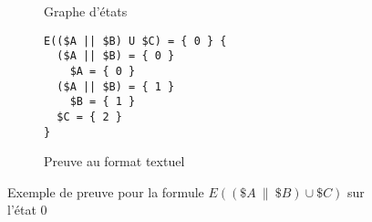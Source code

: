 \begin{figure}[H]
\centering
\begin{subfigure}[b]{.4\textwidth}
\centering
\caption{Graphe d'états}
\end{subfigure}
\begin{subfigure}[b]{.4\textwidth}
\centering
\begin{minipage}{0.74\linewidth}
\begin{verbatim}
E(($A || $B) U $C) = { 0 } {
  ($A || $B) = { 0 }
    $A = { 0 }
  ($A || $B) = { 1 }
    $B = { 1 }
  $C = { 2 }
}
\end{verbatim}
\end{minipage}
\caption{Preuve au format textuel}
\end{subfigure}
\caption{Exemple de preuve pour la formule $E((\$A~\|~\$B) \cup \$C)$ sur l'état 0}
\label{fig:PreuveAffichageTextuelChemin}
\end{figure}